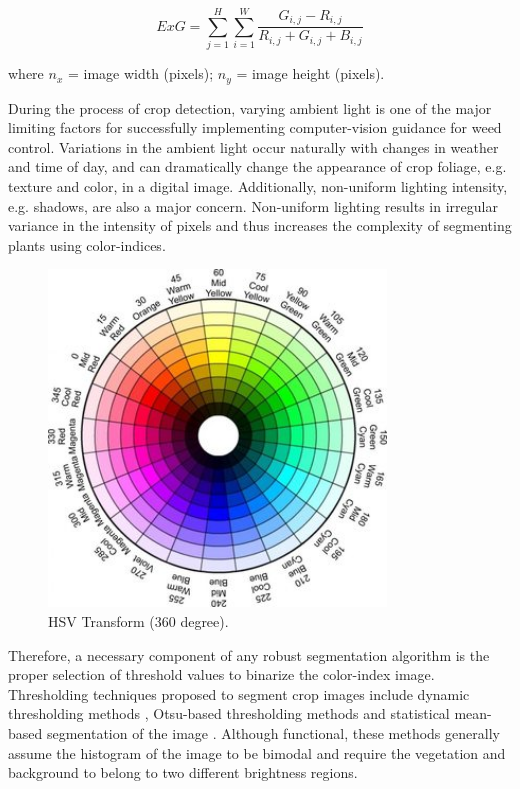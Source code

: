 \documentclass[authoryear]{elsarticle}
\begin{document}
\begin{equation}
    ExG = \displaystyle\sum_{j=1}^{H} \displaystyle\sum_{i=1}^{W}
    \frac{G_{i,j}-R_{i,j}}{R_{i,j} + G_{i,j} + B_{i,j}}
    \label{eq:excess_green}
\end{equation}
\begin{flushleft}
where $n_{x}$ = image width (pixels); $n_{y}$ = image height (pixels).
\end{flushleft}

During the process of crop detection, varying ambient light is one of
the major limiting factors for successfully implementing
computer-vision guidance for weed control. Variations in the ambient
light occur naturally with changes in weather and time of day, and can
dramatically change the appearance of crop foliage, e.g. texture and
color, in a digital image. Additionally, non-uniform lighting
intensity, e.g. shadows, are also a major concern. Non-uniform
lighting results in irregular variance in the intensity of pixels and
thus increases the complexity of segmenting plants using
color-indices.

\begin{figure}
  \centering
  \includegraphics[width=0.8\textwidth,natwidth=610,natheight=642]{hsv.jpg}
  \caption{HSV Transform (360 degree).}
  \label{fig:hsv}
\end{figure}

Therefore, a necessary component of any robust segmentation algorithm
is the proper selection of threshold values to binarize the
color-index image. Thresholding techniques proposed to 
segment crop images include dynamic thresholding methods
\citep{rovira2005}, Otsu-based thresholding methods \citep{meyer2008}
and statistical mean-based segmentation of the image
\citep{guijarro2011}. Although functional, these methods generally
assume the histogram of the image to be bimodal and require the
vegetation and background to belong to two different brightness
regions.
\end{document}
